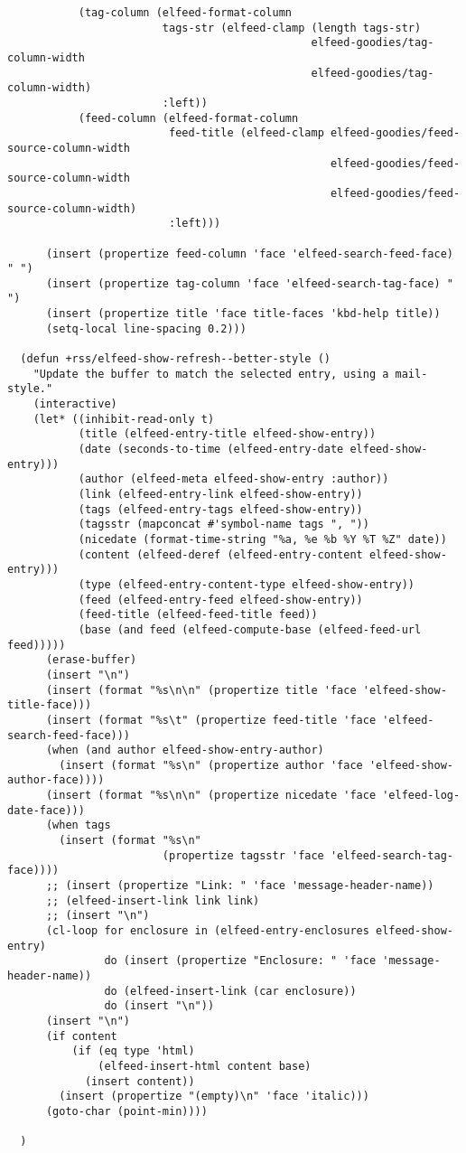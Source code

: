 \documentclass[c]{article}
\theoremstyle{plain}%
\theoremstyle{definition}
\theoremstyle{remark}
\begin{document}
\begin{verbatim}
           (tag-column (elfeed-format-column
                        tags-str (elfeed-clamp (length tags-str)
                                               elfeed-goodies/tag-column-width
                                               elfeed-goodies/tag-column-width)
                        :left))
           (feed-column (elfeed-format-column
                         feed-title (elfeed-clamp elfeed-goodies/feed-source-column-width
                                                  elfeed-goodies/feed-source-column-width
                                                  elfeed-goodies/feed-source-column-width)
                         :left)))

      (insert (propertize feed-column 'face 'elfeed-search-feed-face) " ")
      (insert (propertize tag-column 'face 'elfeed-search-tag-face) " ")
      (insert (propertize title 'face title-faces 'kbd-help title))
      (setq-local line-spacing 0.2)))

  (defun +rss/elfeed-show-refresh--better-style ()
    "Update the buffer to match the selected entry, using a mail-style."
    (interactive)
    (let* ((inhibit-read-only t)
           (title (elfeed-entry-title elfeed-show-entry))
           (date (seconds-to-time (elfeed-entry-date elfeed-show-entry)))
           (author (elfeed-meta elfeed-show-entry :author))
           (link (elfeed-entry-link elfeed-show-entry))
           (tags (elfeed-entry-tags elfeed-show-entry))
           (tagsstr (mapconcat #'symbol-name tags ", "))
           (nicedate (format-time-string "%a, %e %b %Y %T %Z" date))
           (content (elfeed-deref (elfeed-entry-content elfeed-show-entry)))
           (type (elfeed-entry-content-type elfeed-show-entry))
           (feed (elfeed-entry-feed elfeed-show-entry))
           (feed-title (elfeed-feed-title feed))
           (base (and feed (elfeed-compute-base (elfeed-feed-url feed)))))
      (erase-buffer)
      (insert "\n")
      (insert (format "%s\n\n" (propertize title 'face 'elfeed-show-title-face)))
      (insert (format "%s\t" (propertize feed-title 'face 'elfeed-search-feed-face)))
      (when (and author elfeed-show-entry-author)
        (insert (format "%s\n" (propertize author 'face 'elfeed-show-author-face))))
      (insert (format "%s\n\n" (propertize nicedate 'face 'elfeed-log-date-face)))
      (when tags
        (insert (format "%s\n"
                        (propertize tagsstr 'face 'elfeed-search-tag-face))))
      ;; (insert (propertize "Link: " 'face 'message-header-name))
      ;; (elfeed-insert-link link link)
      ;; (insert "\n")
      (cl-loop for enclosure in (elfeed-entry-enclosures elfeed-show-entry)
               do (insert (propertize "Enclosure: " 'face 'message-header-name))
               do (elfeed-insert-link (car enclosure))
               do (insert "\n"))
      (insert "\n")
      (if content
          (if (eq type 'html)
              (elfeed-insert-html content base)
            (insert content))
        (insert (propertize "(empty)\n" 'face 'italic)))
      (goto-char (point-min))))

  )
\end{verbatim}
\end{document}
